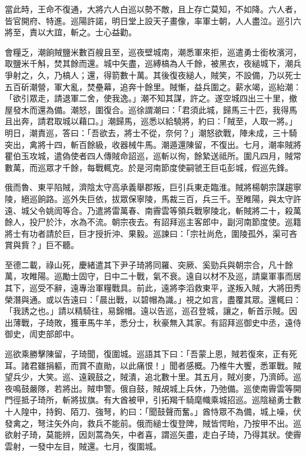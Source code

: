 \begin{pinyinscope}
 當此時，王命不復通，大將六人白巡以勢不敵，且上存亡莫知，不如降。六人者，皆官開府、特進。巡陽許諾，明日堂上設天子畫像，率軍士朝，人人盡泣。巡引六將至，責以大誼，斬之。士心益勸。



 會糧乏，潮餉賊鹽米數百艘且至，巡夜壁城南，潮悉軍來拒，巡遣勇士銜枚濱河，取鹽米千斛，焚其餘而還。城中矢盡，巡縛槁為人千餘，被黑衣，夜縋城下，潮兵爭射之，久，乃槁人；還，得箭數十萬。其後復夜縋人，賊笑，不設備，乃以死士五百斫潮營，軍大亂，焚壘幕，追奔十餘里。賊慚，益兵圍之。薪水竭，巡紿潮：「欲引眾走，請退軍二舍，使我逸。」潮不知其謀，許之。遂空城四出三十里，撤屋發木而還為備。潮怒，圍復合。巡徐謂潮曰：「君須此城，歸馬三十匹，我得馬且出奔，請君取城以藉口。」潮歸馬，巡悉以給驍將，約曰：「賊至，人取一將。」明日，潮責巡，答曰：「吾欲去，將士不從，奈何？」潮怒欲戰，陣未成，三十騎突出，禽將十四，斬百餘級，收器械牛馬。潮遁還陳留，不復出。七月，潮率賊將瞿伯玉攻城，遣偽使者四人傳賊命詔巡，巡斬以徇，餘縶送祗所。圍凡四月，賊常數萬，而巡眾才千餘，每戰輒克。於是河南節度使嗣虢王巨屯彭城，假巡先鋒。



 俄而魯、東平陷賊，濟陰太守高承義舉郡叛，巨引兵東走臨淮。賊將楊朝宗謀趨寧陵，絕巡餉路。巡外失巨依，拔眾保寧陵，馬裁三百，兵三千。至睢陽，與太守許遠、城父令姚訚等合。乃遣將雷萬春、南霽雲等領兵戰寧陵北，斬賊將二十，殺萬餘人，投尸於汴，水為不流。朝宗夜去。有詔拜巡主客郎中，副河南節度使。巡籍將士有功者請於巨，巨才授折沖、果毅。巡諫曰：「宗社尚危，圍陵孤外，渠可吝賞與貲？」巨不聽。



 至德二載，祿山死，慶緒遣其下尹子琦將同羅、突厥、奚勁兵與朝宗合，凡十餘萬，攻睢陽。巡勵士固守，日中二十戰，氣不衰。遠自以材不及巡，請稟軍事而居其下，巡受不辭，遠專治軍糧戰具。前此，遠將李滔救東平，遂叛入賊，大將田秀榮潛與通。或以告遠曰：「晨出戰，以碧帽為識。」視之如言，盡覆其眾。還輒曰：「我誘之也。」請以精騎往，易錦帽。遠以告巡，巡召登城，讓之，斬首示賊。因出薄戰，子琦敗，獲車馬牛羊，悉分士，秋豪無入其家。有詔拜巡御史中丞，遠侍御史，訚吏部郎中。



 巡欲乘勝擊陳留，子琦聞，復圍城。巡語其下曰：「吾蒙上恩，賊若復來，正有死耳。諸君雖捐軀，而賞不直勛，以此痛恨！」聞者感概。乃椎牛大饗，悉軍戰。賊望兵少，大笑。巡、遠親鼓之，賊潰，追北數十里。其五月，賊刈麥，乃濟師。巡夜鳴鼓嚴隊，若將出。賊申警。俄自鼓，賊覘城上兵休，乃弛備。巡使南霽雲等開門徑抵子琦所，斬將拔旗。有大酋被甲，引拓羯千騎麾幟乘城招巡。巡陰縋勇士數十人隍中，持鉤、陌刀、強弩，約曰：「聞鼓聲而奮。」酋恃眾不為備，城上噪，伏發禽之，弩注矢外向，救兵不能前。俄而縋士復登陴，賊皆愕眙，乃按甲不出。巡欲射子琦，莫能辨，因剡蒿為矢，中者喜，謂巡矢盡，走白子琦，乃得其狀。使霽雲射，一發中左目，賊還。七月，復圍城。




\end{pinyinscope}
